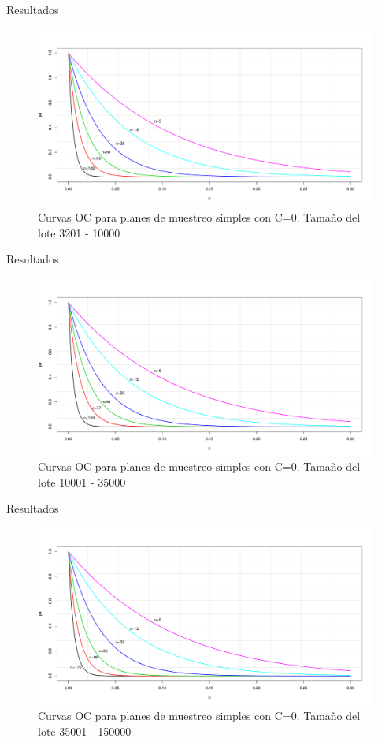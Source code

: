 \documentclass[10pt]{beamer}
\begin{document}
\begin{frame}{Resultados}
\begin{figure}[h!]
  \centering
  \includegraphics[scale=0.33]{FigurasUV/CO11.pdf}
  \caption{Curvas OC para planes de muestreo simples con C=0. Tamaño del lote 3201 - 10000}
\end{figure}
\end{frame}

\begin{frame}{Resultados}
\begin{figure}[h!]
  \centering
  \includegraphics[scale=0.33]{FigurasUV/CO12.pdf}
  \caption{Curvas OC para planes de muestreo simples con C=0. Tamaño del lote 10001 - 35000}
\end{figure}
\end{frame}

\begin{frame}{Resultados}
\begin{figure}[h!]
  \centering
  \includegraphics[scale=0.33]{FigurasUV/CO13.pdf}
  \caption{Curvas OC para planes de muestreo simples con C=0. Tamaño del lote 35001 - 150000}
\end{figure}
\end{frame}
\end{document}
